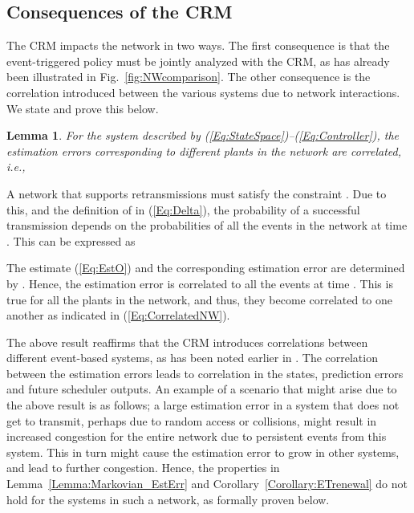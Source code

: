 \documentclass[journal]{IEEEtran}
\newtheorem{lemma}[theorem]{Lemma}
\begin{document}
\subsection{Consequences of the CRM} \label{S:MAconsequences}
The CRM impacts the network in two ways. The first consequence is that the event-triggered policy must be jointly analyzed with the CRM, as has already been illustrated in Fig.~\ref{fig:NWcomparison}. The other consequence is the correlation introduced between the various systems due to network interactions. We state and prove this below. 
\begin{lemma} \label{Lemma:CorrelatedNW}
For the system described by (\ref{Eq:StateSpace})--(\ref{Eq:Controller}), the estimation errors corresponding to different plants in the network are correlated, i.e., 
\end{lemma}
\begin{IEEEproof}
A network that supports  retransmissions must satisfy the constraint . Due to this, and the definition of  in (\ref{Eq:Delta}), the probability of a successful transmission depends on the probabilities of all the events in the network at time . This can be expressed as

The estimate (\ref{Eq:EstO}) and the corresponding estimation error  are determined by . Hence, the estimation error is correlated to all the events at time . This is true for all the plants in the network, and thus, they become correlated to one another as indicated in (\ref{Eq:CorrelatedNW}).
\end{IEEEproof}

The above result reaffirms that the CRM introduces correlations between different event-based systems, as has been noted earlier in \cite{Cervin2008,Rabi2009}. The correlation between the estimation errors leads to correlation in the states, prediction errors and future scheduler outputs. An example of a scenario that might arise due to the above result is as follows; a large estimation error in a system that does not get to transmit, perhaps due to random access or collisions, might result in increased congestion for the entire network due to persistent events from this system. This in turn might cause the estimation error to grow in other systems, and lead to further congestion. Hence, the properties in Lemma~\ref{Lemma:Markovian_EstErr} and Corollary~\ref{Corollary:ETrenewal} do not hold for the systems in such a network, as formally proven below.
\end{document}
